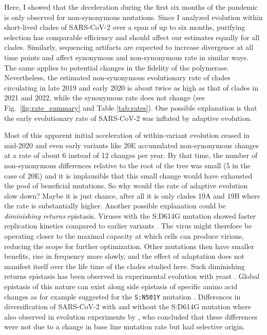 \documentclass[aps,rmp, twocolumn]{revtex4}
\begin{document}
Here, I showed that the deceleration during the first six months of the pandemic is only observed for non-synonymous mutations.
Since I analyzed evolution within short-lived clades of SARS-CoV-2 over a span of up to six months, purifying selection has comparable efficiency and should affect our estimates equally for all clades.
Similarly, sequencing artifacts are expected to increase divergence at all time points and affect synonymous and non-synonymous rate in similar ways.
The same applies to potential changes in the fidelity of the polymerase.
Nevertheless, the estimated non-synonymous evolutionary rate of clades circulating in late 2019 and early 2020 is about twice as high as that of clades in 2021 and 2022, while the synonymous rate does not change (see Fig.~\ref{fig:rate_summary} and Table \ref{tab:rates}).
One possible explanation is that the early evolutionary rate of SARS-CoV-2 was inflated by adaptive evolution.

Most of this apparent initial acceleration of within-variant evolution ceased in mid-2020 and even early variants like 20E accumulated non-synonymous changes at a rate of about 6 instead of 12 changes per year.
By that time, the number of non-synonymous differences relative to the root of the tree was small (5 in the case of 20E) and it is implausible that this small change would have exhausted the pool of beneficial mutations.
So why would the rate of adaptive evolution slow down?
Maybe it is just chance, after all it is only clades 19A and 19B where the rate is substantially higher.
Another possible explanation could be \emph{diminishing returns} epistasis.
Viruses with the S:D614G mutation showed faster replication kinetics compared to earlier variants \citep{korber_tracking_2020}.
The virus might therefore be operating closer to the maximal capacity at which cells can produce virions, reducing the scope for further optimization.
Other mutations then have smaller benefits, rise in frequency more slowly, and the effect of adaptation does not manifest itself over the life time of the clades studied here.
Such diminishing returns epistasis has been observed in experimental evolution with yeast \citep{kryazhimskiy_global_2014}.
Global epistasis of this nature can exist along side epistasis of specific amino acid changes as for example suggested for the \texttt{S:N501Y} mutation \citep{martin_emergence_2021,rochman_epistasis_2022,martin_selection_2022}.
Differences in diversification of SARS-CoV-2 with and without the S:D614G mutation where also observed in evolution experiments by \citet{amicone_mutation_2022}, who concluded that these differences were not due to a change in base line mutation rate but had selective origin.
\end{document}
